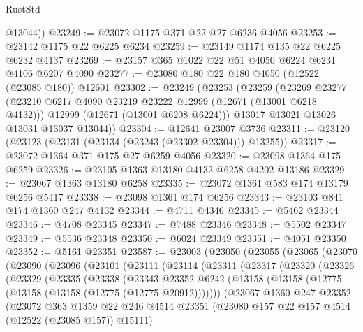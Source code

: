 \begin{lexlean}{RustStd}
\begin{coremodule}
        @13044))
@23249 := @23072 @1175 @371 @22 @27 @6236 @4056
@23253 := @23142 @1175 @22 @6225 @6234
@23259 := @23149 @1174 @135 @22 @6225 @6232 @4137
@23269 := @23157 @365 @1022 @22 @51 @4050 @6224 @6231 @4106 @6207 @4090
@23277 := @23080 @180 @22 @180 @4050 (@12522 (@23085 @180)) @12601
@23302 := @23249
    (@23253
      (@23259
        (@23269
          @23277
          (@23210 @6217 @4090 @23219 @23222 @12999 (@12671 (@13001 @6218 @4132)))
          @12999
          (@12671 (@13001 @6208 @6224)))
        @13017
        @13021
        @13026
        @13031
        @13037
        @13044))
@23304 := @12641 @23007 @3736
@23311 := @23120 (@23123 (@23131 (@23134 (@23243 (@23302 @23304))) @13255))
@23317 := @23072 @1364 @371 @175 @27 @6259 @4056
@23320 := @23098 @1364 @175 @6259
@23326 := @23105 @1363 @13180 @4132 @6258 @4202 @13186
@23329 := @23067 @1363 @13180 @6258
@23335 := @23072 @1361 @583 @174 @13179 @6256 @5417
@23338 := @23098 @1361 @174 @6256
@23343 := @23103 @841 @174 @1360 @247 @4132
@23344 := @4711 @4346
@23345 := @5462 @23344
@23346 := @4708 @23345
@23347 := @7488 @23346
@23348 := @5502 @23347
@23349 := @5536 @23348
@23350 := @6024 @23349
@23351 := @4051 @23350
@23352 := @5161 @23351
@23587 := @23003
    (@23050
      (@23055
        (@23065
          (@23070
            (@23090
              (@23096
                (@23101
                  (@23111
                    (@23114
                      (@23311
                        (@23317
                          (@23320
                            (@23326
                              (@23329
                                (@23335
                                  (@23338
                                    (@23343
                                      @23352
                                      @6242
                                      (@13158
                                        (@13158
                                          (@12775 (@13158 (@13158 (@12775 (@12775 @20912)))))))
                                      (@23067
                                        @1360
                                        @247
                                        @23352
                                        (@23072
                                          @363
                                          @1359
                                          @22
                                          @246
                                          @4514
                                          @23351
                                          (@23080 @157 @22 @157 @4514 (@12522 (@23085 @157)) @15111)

\end{coremodule}
\end{lexlean}
